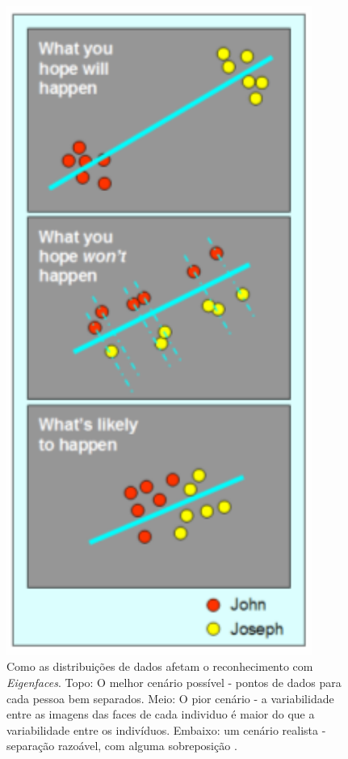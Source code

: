 	\begin{figure}[hbt]
		\begin{center}
			\includegraphics[width=10cm]{figuras/2.FundamentacaoTeorica/espacoPCA.png}
		\end{center}
		\caption{Como as distribuições de dados afetam o reconhecimento com \textit{Eigenfaces}. Topo: O melhor cenário possível - pontos de dados para cada pessoa bem separados. Meio: O pior cenário - a variabilidade entre as imagens das faces de cada individuo é maior do que a variabilidade entre os indivíduos. Embaixo: um cenário realista - separação razoável, com alguma sobreposição \cite{hewitt}.}
		\label{exemploEspacoPCA}
	\end{figure}

